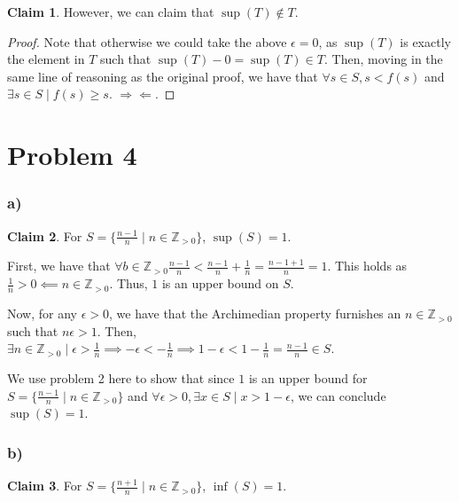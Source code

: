 \documentclass[12pt,letterpaper]{article}
\theoremstyle{definition}
\newtheorem*{claim}{Claim}
\newcommand{\contra}{\Rightarrow\!\Leftarrow}
\newcommand{\Zg}{\mathbb{Z}_{>0}}
\begin{document}
\begin{claim}
  However, we can claim that $\sup(T) \notin T$.
\end{claim}
  
\begin{proof}
  Note that otherwise we could take the above $\epsilon = 0$, as $\sup(T)$ is
  exactly  the element in $T$ such that $\sup(T) - 0 = \sup(T) \in T$. Then,
  moving in the same line of reasoning as the original proof, we have that
  $\forall s \in S, s < f(s)$ and $\exists s \in S \mid f(s) \geq s$. $\contra$.
\end{proof}

\section*{Problem 4}

\subsubsection*{a)}

\begin{claim}
  For $S = \{\frac{n-1}{n} \mid n \in \Zg\}$, $\sup(S) = 1$.
\end{claim}

First, we have that $\forall b \in \Zg \frac{n-1}{n} < \frac{n-1}{n} + \frac{1}{n} =
\frac{n-1+1}{n} = 1$. This holds as $\frac{1}{n} > 0 \impliedby n \in \Zg$.
Thus, $1$ is an upper bound on $S$.

Now, for any $\epsilon > 0$, we have that the Archimedian property furnishes an
$n \in \Zg$ such that $n\epsilon > 1$. Then, $\exists n \in \Zg \mid \epsilon >
\frac{1}{n} \implies -\epsilon < -\frac{1}{n} \implies 1 - \epsilon < 1 -
\frac{1}{n} = \frac{n-1}{n} \in S$. 

We use problem 2 here to show that since $1$ is an upper bound for $S =
\{\frac{n-1}{n} \mid n \in \Zg\}$ and $\forall \epsilon > 0, \exists x \in
S \mid x > 1 - \epsilon$, we can conclude $\sup(S) = 1$.

\subsubsection*{b)}

\begin{claim}
  For $S = \{\frac{n+1}{n} \mid n \in \Zg\}$, $\inf(S) = 1$.
\end{claim}
\end{document}
